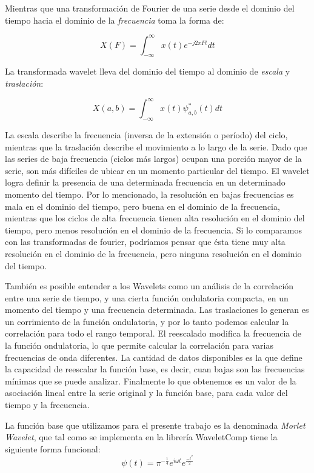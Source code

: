\documentclass[a4paper]{article}
\begin{document}
Mientras que una transformación de Fourier de una serie desde el dominio del tiempo hacia el dominio de la \textit{frecuencia} toma la forma de:

$$
X(F)=\int_{-\infty}^{\infty} x(t) e^{-j2\pi Ft}dt
$$

La transformada wavelet lleva del dominio del tiempo al dominio de \textit{escala} y \textit{traslación}:

$$
X(a,b)=\int_{-\infty}^{\infty} x(t) \psi^*_{a,b}(t)dt
$$

La escala describe la frecuencia (inversa de la extensión o período) del ciclo, mientras que la traslación describe el movimiento a lo largo de la serie. Dado que las series de baja frecuencia (ciclos más largos) ocupan una porción mayor de la serie, son más difíciles de ubicar en un momento particular del tiempo. El wavelet logra definir la presencia de una determinada frecuencia en un determinado momento del tiempo. Por lo mencionado, la resolución en bajas frecuencias es mala en el dominio del tiempo, pero buena en el dominio de la frecuencia, mientras que los ciclos de alta frecuencia tienen alta resolución en el dominio del tiempo, pero menos resolución en el dominio de la frecuencia. Si lo comparamos con las transformadas de fourier, podríamos pensar que ésta tiene muy alta resolución en el dominio de la frecuencia, pero ninguna resolución en el dominio del tiempo. 

También es posible entender a los Wavelets como un análisis de la correlación entre una serie de tiempo, y una cierta función ondulatoria compacta, en un momento del tiempo y una frecuencia determinada. Las traslaciones lo generan es un corrimiento de la función ondulatoria, y por lo tanto podemos calcular la correlación para todo el rango temporal. El reescalado modifica la frecuencia de la función ondulatoria, lo que permite calcular la correlación para varias frecuencias de onda diferentes. La cantidad de datos disponibles es la que define la capacidad de reescalar la función base, es decir, cuan bajas son las frecuencias mínimas que se puede analizar. Finalmente lo que obtenemos es un valor de la asociación lineal entre la serie original y la función base, para cada valor del tiempo y la frecuencia.  

La función base que utilizamos para el presente trabajo es la denominada \textit{Morlet Wavelet}, que tal como se implementa en la librería WaveletComp \citep{Roesch2018} tiene la siguiente forma funcional:
$$
\psi(t)=\pi^{-\frac{1}{4}}e^{i\omega t}e^{\frac{-t^2}{2}}
$$
\end{document}
